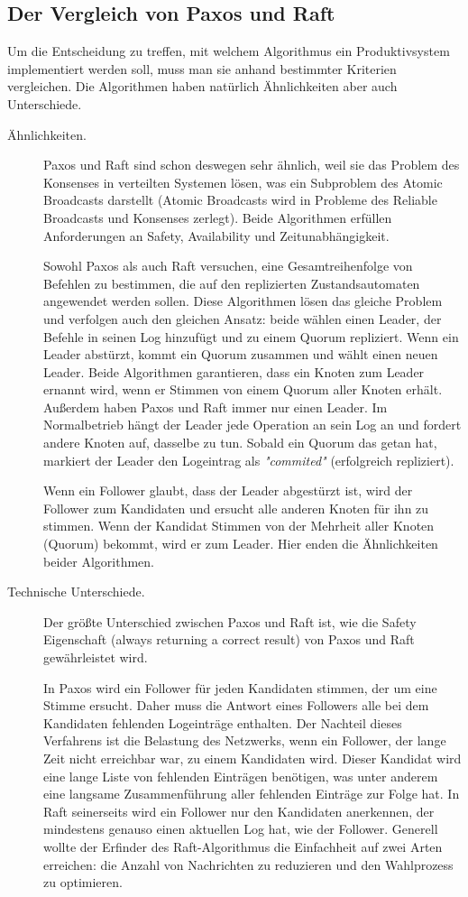 \subsection{Der Vergleich von Paxos und Raft}

Um die Entscheidung zu treffen, mit welchem Algorithmus ein Produktivsystem implementiert werden soll, muss man sie anhand bestimmter Kriterien vergleichen. Die Algorithmen haben natürlich Ähnlichkeiten aber auch Unterschiede.

\begin{description} 
	\item[Ähnlichkeiten.] Paxos und Raft sind schon deswegen sehr ähnlich, weil sie das Problem des Konsenses in verteilten Systemen lösen, was ein Subproblem des Atomic Broadcasts darstellt (Atomic Broadcasts wird in Probleme des Reliable Broadcasts und Konsenses zerlegt). Beide Algorithmen erfüllen Anforderungen an Safety, Availability und Zeitunabhängigkeit.
	
	Sowohl Paxos als auch Raft versuchen, eine Gesamtreihenfolge von Befehlen zu bestimmen, die auf den replizierten Zustandsautomaten angewendet werden sollen. Diese Algorithmen lösen das gleiche Problem und verfolgen auch den gleichen Ansatz: beide wählen einen Leader, der Befehle in seinen Log hinzufügt und zu einem Quorum repliziert. Wenn ein Leader abstürzt, kommt ein Quorum zusammen und wählt einen neuen Leader. Beide Algorithmen garantieren, dass ein Knoten zum Leader ernannt wird, wenn er Stimmen von einem Quorum aller Knoten erhält. Außerdem haben Paxos und Raft immer nur einen Leader. Im Normalbetrieb hängt der Leader jede Operation an sein Log an und fordert andere Knoten auf, dasselbe zu tun. Sobald ein Quorum das getan hat, markiert der Leader den Logeintrag als \textit{"commited"} (erfolgreich repliziert).
	
	Wenn ein Follower glaubt, dass der Leader abgestürzt ist, wird der Follower zum Kandidaten und ersucht alle anderen Knoten für ihn zu stimmen. Wenn der Kandidat Stimmen von der Mehrheit aller Knoten (Quorum) bekommt, wird er zum Leader. Hier enden die Ähnlichkeiten beider Algorithmen.
	
	
	\item[Technische Unterschiede.] Der größte Unterschied zwischen Paxos und Raft ist, wie die Safety Eigenschaft (always returning a correct result) von Paxos und Raft gewährleistet wird.
	
	In Paxos wird ein Follower für jeden Kandidaten stimmen, der um eine Stimme ersucht. Daher muss die Antwort eines Followers alle bei dem Kandidaten fehlenden Logeinträge enthalten. Der Nachteil dieses Verfahrens ist die Belastung des Netzwerks, wenn ein Follower, der lange Zeit nicht erreichbar war, zu einem Kandidaten wird. Dieser Kandidat wird eine lange Liste von fehlenden Einträgen benötigen, was unter anderem eine langsame Zusammenführung aller fehlenden Einträge zur Folge hat. In Raft seinerseits wird ein Follower nur den Kandidaten anerkennen, der mindestens genauso einen aktuellen Log hat, wie der Follower. Generell wollte der Erfinder des Raft-Algorithmus die Einfachheit auf zwei Arten erreichen: die Anzahl von Nachrichten zu reduzieren und den Wahlprozess zu optimieren.
	

\end{description}
